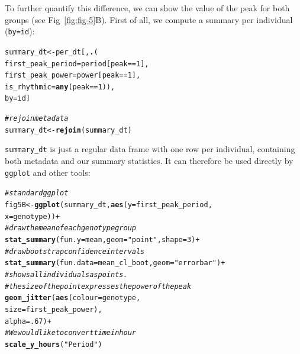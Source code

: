 \documentclass[10pt,letterpaper]{article}\usepackage[]{graphicx}\usepackage[]{color}
\makeatletter
\newcommand{\hlnum}[1]{\textcolor[rgb]{0.686,0.059,0.569}{#1}}%
\newcommand{\hlstr}[1]{\textcolor[rgb]{0.192,0.494,0.8}{#1}}%
\newcommand{\hlcom}[1]{\textcolor[rgb]{0.678,0.584,0.686}{\textit{#1}}}%
\newcommand{\hlopt}[1]{\textcolor[rgb]{0,0,0}{#1}}%
\newcommand{\hlstd}[1]{\textcolor[rgb]{0.345,0.345,0.345}{#1}}%
\newcommand{\hlkwb}[1]{\textcolor[rgb]{0.69,0.353,0.396}{#1}}%
\newcommand{\hlkwc}[1]{\textcolor[rgb]{0.333,0.667,0.333}{#1}}%
\newcommand{\hlkwd}[1]{\textcolor[rgb]{0.737,0.353,0.396}{\textbf{#1}}}%
\newenvironment{kframe}{%
 \def\at@end@of@kframe{}%
 \ifinner\ifhmode%
  \def\at@end@of@kframe{\end{minipage}}%
  \begin{minipage}{\columnwidth}%
 \fi\fi%
 \def\FrameCommand##1{\hskip\@totalleftmargin \hskip-\fboxsep
 \colorbox{shadecolor}{##1}\hskip-\fboxsep
     \hskip-\linewidth \hskip-\@totalleftmargin \hskip\columnwidth}%
 \MakeFramed {\advance\hsize-\width
   \@totalleftmargin\z@ \linewidth\hsize
   \@setminipage}}%
 {\par\unskip\endMakeFramed%
 \at@end@of@kframe}
\newenvironment{knitrout}{}{} %
\makeatother
\begin{document}
To further quantify this difference, we can show the value of the peak for both groups (see Fig~\ref{fig:fig-5}B). First of all, we compute a summary per individual (\texttt{by=id}):

\begin{knitrout}
\color{fgcolor}\begin{kframe}
\begin{alltt}
\hlstd{summary_dt} \hlkwb{<-} \hlstd{per_dt[,}\hlkwd{.}\hlstd{(}
                        \hlkwc{first_peak_period} \hlstd{= period[peak}\hlopt{==}\hlnum{1}\hlstd{],}
                        \hlkwc{first_peak_power} \hlstd{= power[peak}\hlopt{==}\hlnum{1}\hlstd{],}
                        \hlkwc{is_rhythmic} \hlstd{=} \hlkwd{any}\hlstd{(peak}\hlopt{==}\hlnum{1}\hlstd{)),}
                      \hlkwc{by}\hlstd{=id]}


\hlcom{# rejoin metadata}
\hlstd{summary_dt} \hlkwb{<-} \hlkwd{rejoin}\hlstd{(summary_dt)}
\end{alltt}
\end{kframe}
\end{knitrout}

\texttt{summary\_dt} is just a regular data frame with one row per individual, containing both metadata and our summary statistics. It can therefore be used directly by \texttt{ggplot} and other tools:

\begin{knitrout}
\color{fgcolor}\begin{kframe}
\begin{alltt}
\hlcom{# standard ggplot}
\hlstd{fig5B} \hlkwb{<-} \hlkwd{ggplot}\hlstd{(summary_dt,} \hlkwd{aes}\hlstd{(}\hlkwc{y} \hlstd{= first_peak_period,}
                                \hlkwc{x} \hlstd{= genotype))} \hlopt{+}
              \hlcom{# draw the mean of each genotype group}
              \hlkwd{stat_summary}\hlstd{(}\hlkwc{fun.y} \hlstd{= mean,} \hlkwc{geom} \hlstd{=} \hlstr{"point"}\hlstd{,} \hlkwc{shape}\hlstd{=}\hlnum{3}\hlstd{)} \hlopt{+}
              \hlcom{# draw bootstrap confidence intervals}
              \hlkwd{stat_summary}\hlstd{(}\hlkwc{fun.data} \hlstd{= mean_cl_boot,} \hlkwc{geom} \hlstd{=} \hlstr{"errorbar"}\hlstd{)} \hlopt{+}
              \hlcom{# shows all individuals as points. }
              \hlcom{# the size of the point expresses the power of the peak}
              \hlkwd{geom_jitter}\hlstd{(}\hlkwd{aes}\hlstd{(}\hlkwc{colour}\hlstd{= genotype,}
                              \hlkwc{size}\hlstd{=first_peak_power),}
                          \hlkwc{alpha}\hlstd{=}\hlnum{.67}\hlstd{)} \hlopt{+}
              \hlcom{# We would like to convert time in hour}
              \hlkwd{scale_y_hours}\hlstd{(}\hlstr{"Period"}\hlstd{)}
\end{alltt}
\end{kframe}
\end{knitrout}
\end{document}
